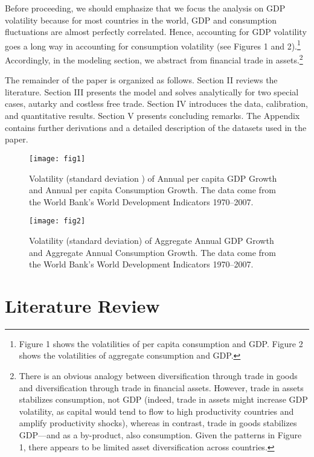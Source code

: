 \documentclass[12pt]{article}
\begin{document}
Before proceeding, we should emphasize that we focus the analysis on GDP
volatility because for most countries in the world, GDP and consumption
fluctuations are almost perfectly correlated. Hence, accounting for GDP
volatility goes a long way in accounting for consumption volatility (see
Figures 1 and 2).\footnote{%
Figure 1 shows the volatilities of per capita consumption and GDP. Figure 2
shows the volatilities of aggregate consumption and GDP.} Accordingly, in
the modeling section, we abstract from financial trade in assets.\footnote{%
There is an obvious analogy between diversification through trade in goods
and diversification through trade in financial assets. However, trade in
assets stabilizes consumption, not GDP (indeed, trade in assets might
increase GDP volatility, as capital would tend to flow to high productivity
countries and amplify productivity shocks), whereas in contrast, trade in
goods stabilizes GDP---and as a by-product, also consumption. Given the
patterns in Figure 1, there appears to be limited asset diversification
across countries.}

The remainder of the paper is organized as follows. Section II reviews the
literature. Section III presents the model and solves analytically for two
special cases, autarky and costless free trade. Section IV introduces the
data, calibration, and quantitative results. Section V presents concluding
remarks. The Appendix contains further derivations and a detailed
description of the datasets used in the paper.

\begin{center}
\begin{figure}[h]
\centering\texttt{[image: fig1]}
\caption{Volatility (standard deviation ) of Annual per capita GDP Growth
and Annual per capita Consumption Growth. The data come from the World
Bank's World Development Indicators 1970--2007.}
\end{figure}

\begin{figure}[h]
\centering
\texttt{[image: fig2]}
\caption{Volatility (standard deviation) of Aggregate Annual GDP Growth and
Aggregate Annual Consumption Growth. The data come from the World Bank's
World Development Indicators 1970--2007.}
\end{figure}
\end{center}

\section{Literature Review}
\end{document}
